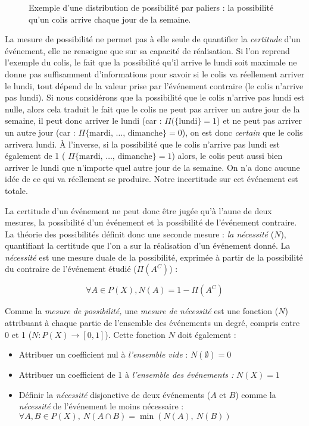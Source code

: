 \begin{figure}
  \centering
  
  \caption{Exemple d'une distribution de possibilité par paliers : la
    possibilité qu'un colis arrive chaque jour de la semaine.}
  \label{fig:fnc_possib}
\end{figure}

La mesure de possibilité ne permet pas à elle seule de quantifier la
\emph{certitude} d'un événement, elle ne renseigne que sur sa capacité
de réalisation. Si l'on reprend l’exemple du colis, le fait que la
possibilité qu'il arrive le lundi soit maximale ne donne pas
suffisamment d'informations pour savoir si le colis va réellement
arriver le lundi, tout dépend de la valeur prise par l'événement
contraire (\ie le colis n'arrive pas lundi). Si nous considérons que
la possibilité que le colis n'arrive pas lundi est nulle, alors cela
traduit le fait que le colis ne peut pas arriver un autre jour de la
semaine, il peut donc arriver le lundi (car :
\(\Pi(\{\text{lundi}\}=1\)) et ne peut pas arriver un autre jour (car
: \(\Pi\{\text{mardi, …, dimanche}\}=0\)), on est donc \emph{certain}
que le colis arrivera lundi. À l'inverse, si la possibilité que le
colis n'arrive pas lundi est également de 1 (\ie
\(\Pi\{\text{mardi, …, dimanche}\}=1\)) alors, le colis peut aussi
bien arriver le lundi que n'importe quel autre jour de la semaine. On
n'a donc aucune idée de ce qui va réellement se produire. Notre
incertitude sur cet événement est totale.

La certitude d'un événement ne peut donc être jugée qu'à l'aune de
deux mesures, la possibilité d'un événement et la possibilité de
l'événement contraire. La théorie des possibilités définit donc une
seconde mesure : \emph{la nécessité} (\(N\)), quantifiant la certitude
que l'on a sur la réalisation d'un événement donné. La
\emph{nécessité} est une mesure duale de la possibilité, exprimée à
partir de la possibilité du contraire de l'événement étudié
(\(\Pi(A^C)\)) :

\begin{equation}
  \label{eq:nec_comp}
  \forall A \in P(X), N(A) = 1 - \Pi(A^C)
\end{equation}

Comme la \emph{mesure de possibilité,} une \emph{mesure de nécessité}
est une fonction (\(N\)) attribuant à chaque partie de l'ensemble des
événements un degré, compris entre 0 et 1
(\(N : P(X) \rightarrow [0,1]\)). Cette fonction \(N\) doit également
:

\begin{itemize}
\item Attribuer un coefficient nul à \emph{l'ensemble vide} :
  \(N(∅)=0\)
\item Attribuer un coefficient de 1 à \emph{l'ensemble des événements
    :} \(N(X)=1\)
\item Définir la \emph{nécessité} disjonctive de deux événements
  (\(A\) et \(B\)) comme la \emph{nécessité} de l'événement le moins
  nécessaire : \(∀ A,B ∈ P(X),\ N(A \cap B) = \min(N(A),\ N(B))\)
\end{itemize}

